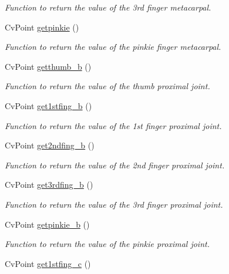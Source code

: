 \begin{DoxyCompactItemize}
\begin{DoxyCompactList}\small\item\em Function to return the value of the 3rd finger metacarpal. \end{DoxyCompactList}\item 
CvPoint \hyperlink{classFullhand_a56bb1c2f627d6980fb5a0bdb8526cd66}{getpinkie} ()
\begin{DoxyCompactList}\small\item\em Function to return the value of the pinkie finger metacarpal. \end{DoxyCompactList}\item 
CvPoint \hyperlink{classFullhand_ac14533aae77906e829390fc46caf551e}{getthumb\_\-b} ()
\begin{DoxyCompactList}\small\item\em Function to return the value of the thumb proximal joint. \end{DoxyCompactList}\item 
CvPoint \hyperlink{classFullhand_ae96acba02047df62646bdd07cf4bd678}{get1stfing\_\-b} ()
\begin{DoxyCompactList}\small\item\em Function to return the value of the 1st finger proximal joint. \end{DoxyCompactList}\item 
CvPoint \hyperlink{classFullhand_aa710aeaf39108e802de8baa63193d93f}{get2ndfing\_\-b} ()
\begin{DoxyCompactList}\small\item\em Function to return the value of the 2nd finger proximal joint. \end{DoxyCompactList}\item 
CvPoint \hyperlink{classFullhand_a6e035e567ae7cefb04abc13010a0bea0}{get3rdfing\_\-b} ()
\begin{DoxyCompactList}\small\item\em Function to return the value of the 3rd finger proximal joint. \end{DoxyCompactList}\item 
CvPoint \hyperlink{classFullhand_abf1eccca6f6accd28ad5904593bc487f}{getpinkie\_\-b} ()
\begin{DoxyCompactList}\small\item\em Function to return the value of the pinkie proximal joint. \end{DoxyCompactList}\item 
CvPoint \hyperlink{classFullhand_a67493060acd9282f0e2ba86c5b081583}{get1stfing\_\-c} ()

\end{DoxyCompactItemize}
